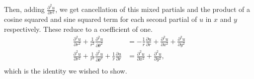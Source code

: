 \documentclass{article}
\begin{document}
  Then, adding $\frac{\partial^{2} u}{\partial r^2}$, we get cancellation of this mixed partials and the product of a cosine squared and sine squared term for each second partial of $u$ in  $x$ and  $y$ respectively. These reduce to a coefficient of one.
  \begin{align*}
    \frac{\partial^{2} u}{\partial r^2}+\frac{1}{r^2}\frac{\partial^{2} u}{\partial \theta^2}&=-\frac{1}{r}\frac{\partial u}{\partial r}+\frac{\partial^{2} u}{\partial x^2}+\frac{\partial^{2} u}{\partial y^2} \\
    \frac{\partial^{2} u}{\partial r^2}+\frac{1}{r^2}\frac{\partial^{2} u}{\partial \theta^2}+\frac{1}{r}\frac{\partial u}{\partial r}&=\frac{\partial^{2} u}{\partial x^2}+\frac{\partial^{2} u}{\partial y^2}, \\
  \end{align*}
  which is the identity we wished to show.
\end{document}
